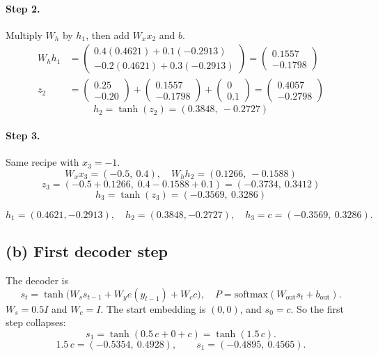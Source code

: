 \documentclass[11pt,a4paper]{article}
\begin{document}
\paragraph{Step 2.} Multiply \(W_h\) by \(h_1\), then add \(W_x x_2\) and \(b\).
\begin{align*}
W_h h_1 &= \begin{pmatrix}0.4(0.4621)+0.1(-0.2913)\\ -0.2(0.4621)+0.3(-0.2913)\end{pmatrix}
= \begin{pmatrix}0.1557\\ -0.1798\end{pmatrix}\\
z_2 &= \begin{pmatrix}0.25\\ -0.20\end{pmatrix} + \begin{pmatrix}0.1557\\ -0.1798\end{pmatrix} + \begin{pmatrix}0\\ 0.1\end{pmatrix}
= \begin{pmatrix}0.4057\\ -0.2798\end{pmatrix}
\end{align*}
\[
h_2=\tanh(z_2)=(0.3848,\ -0.2727)
\]

\paragraph{Step 3.} Same recipe with \(x_3=-1\).
\[
W_x x_3 = (-0.5,\ 0.4), \quad W_h h_2=(0.1266,\ -0.1588)
\]
\[
z_3=(-0.5+0.1266,\; 0.4-0.1588+0.1)=(-0.3734,\ 0.3412)
\]
\[
h_3=\tanh(z_3)=(-0.3569,\ 0.3286)
\]

\begin{answer}[Q2(a)]
\[
h_1=(0.4621,-0.2913),\quad
h_2=(0.3848,-0.2727),\quad
h_3=c=(-0.3569,\ 0.3286).
\]
\end{answer}

\subsection{(b) First decoder step}

The decoder is
\[
s_t=\tanh\!\big(W_s s_{t-1}+W_y e(y_{t-1})+W_c c\big),
\quad
P=\mathrm{softmax}(W_{\mathrm{out}}s_t+b_{\mathrm{out}}).
\]
\(W_s=0.5I\) and \(W_c=I\). The start embedding is \((0,0)\), and \(s_0=c\). So the first step collapses:
\[
s_1=\tanh(0.5\,c + 0 + c)=\tanh(1.5\,c).
\]
\[
1.5\,c = (-0.5354,\ 0.4928), \qquad s_1=(-0.4895,\ 0.4565).
\]
\end{document}
